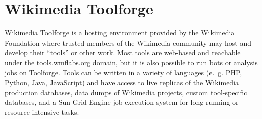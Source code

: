 \section{Wikimedia Toolforge}
\label{sec:Background:Toolforge}


Wikimedia Toolforge is a hosting environment provided by the Wikimedia Foundation
where trusted members of the \gls{Wikimedia} community may host and develop their “tools” or other work.
Most tools are web-based and reachable under the \href{https://tools.wmflabs.org/}{tools.wmflabs.org} domain,
but it is also possible to run bots or analysis jobs on Toolforge.
Tools can be written in a variety of languages
(e.~g. PHP, Python, Java, JavaScript)
and have access to live replicas of the \gls{Wikimedia} production databases,
data dumps of \gls{Wikimedia} projects,
custom tool-specific databases,
and a Sun Grid Engine job execution system for long-running or resource-intensive tasks.

